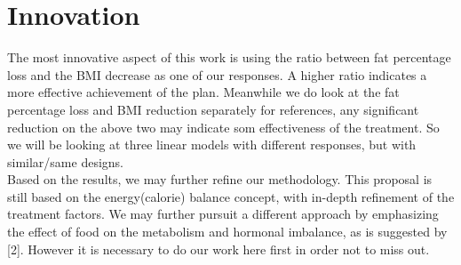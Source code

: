 \documentclass[11pt]{article}  %
\begin{document}

\section{Innovation}
The most innovative aspect of this work is using the ratio between fat percentage loss and the BMI decrease as one of our responses. A higher ratio indicates a more effective achievement of the plan. Meanwhile we do look at the fat percentage loss and BMI reduction separately for references, any significant reduction on the above two may indicate som effectiveness of the treatment. So we will be looking at three linear models with different responses, but with similar/same designs.\\
Based on the results, we may further refine our methodology. This proposal is still based on the energy(calorie) balance concept, with in-depth refinement of the treatment factors. We may further pursuit a different approach by emphasizing the effect of food on the metabolism and hormonal imbalance, as is suggested by [2]. However it is necessary to do our work here first in order not to miss out.
\end{document}
